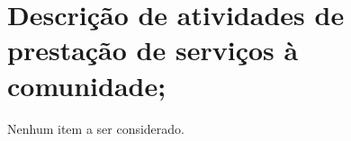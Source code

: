 \section[Descrição de atividades de prestação de serviços à comunidade]{Descrição de atividades de prestação de serviços à comunidade;}

Nenhum item a ser considerado.